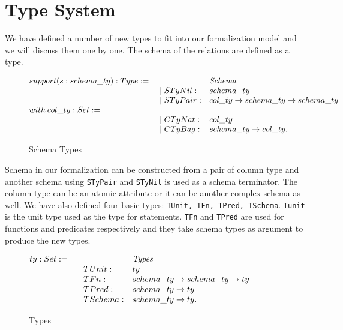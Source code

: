 \section{Type System}
\label{sec:types}

We have defined a number of new types to fit into our formalization model and we will discuss them one by one. The schema of the relations are defined as a type.

\begin{figure}
\begin{center}
$\begin{array}{@{}l@{~}l@{\quad}l@{\!\!\!\!\!\!}r}
support (s : schema\_ty): Type := & & \emph{Schema} \\
& \quad \mid STyNil: & schema\_ty\\
& \quad \mid STyPair: & col\_ty \rightarrow schema\_ty \rightarrow schema\_ty\\
with \:col\_ty : Set := & & \\
& \quad \mid CTyNat: & col\_ty\\
& \quad \mid CTyBag: & schema\_ty \rightarrow col\_ty. \\
\end{array}
$
\end{center}
\caption{Schema Types}
\label{fig-schema_types}
\end{figure}

Schema in our formalization can be constructed from a pair of column type and another schema using \texttt{STyPair} and \texttt{STyNil} is used as a schema terminator. The column type can be an atomic attribute or it can be another complex schema as well. We have also defined four basic types: \texttt{TUnit, TFn, TPred, TSchema}. \texttt{Tunit} is the unit type used as the type for statements. \texttt{TFn} and \texttt{TPred} are used for functions and predicates respectively and they take schema types as argument to produce the new types.

\begin{figure}
\begin{center}
$\begin{array}{@{}l@{~}l@{\quad}l@{\!\!\!\!\!\!}r}
ty : Set := & \ \ \ \ \ & \emph{Types} \\
& \quad \mid TUnit: & ty\\
& \quad \mid TFn: & schema\_ty \rightarrow schema\_ty \rightarrow ty\\
& \quad \mid TPred: & schema\_ty \rightarrow ty\\
& \quad \mid TSchema: & schema\_ty \rightarrow ty. \\
\end{array}
$
\end{center}
\caption{Types}
\label{fig-types}
\end{figure} 

